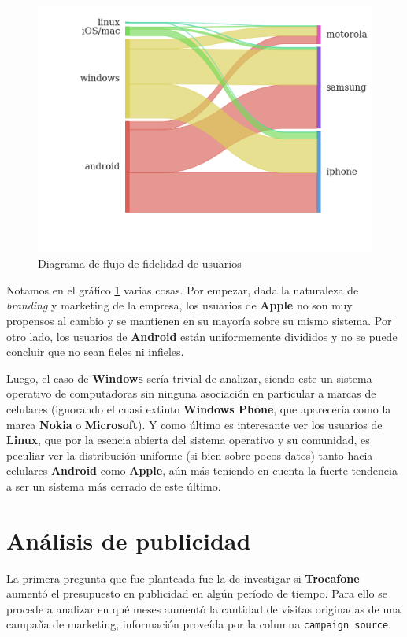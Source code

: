 \documentclass[a4paper]{article}
\begin{document}
\begin{figure}[h!]
	\includegraphics[width=\linewidth]{figures/151-os_brands-sankey.png}
	\caption{Diagrama de flujo de fidelidad de usuarios}
	\label{fig:sankey}
\end{figure}

Notamos en el gráfico \ref{fig:sankey} varias cosas. Por empezar, dada la naturaleza de \textit{branding} y marketing de la empresa, los usuarios de \textbf{Apple} no son muy propensos al cambio y se mantienen en su mayoría sobre su mismo sistema. Por otro lado, los usuarios de \textbf{Android} están uniformemente divididos y no se puede concluir que no sean fieles ni infieles. 

Luego, el caso de \textbf{Windows} sería trivial de analizar, siendo este un sistema operativo de computadoras sin ninguna asociación en particular a marcas de celulares (ignorando el cuasi extinto \textbf{Windows Phone}, que aparecería como la marca \textbf{Nokia} o \textbf{Microsoft}). Y como último es interesante ver los usuarios de \textbf{Linux}, que por la esencia abierta del sistema operativo y su comunidad, es peculiar ver la distribución uniforme (si bien sobre pocos datos) tanto hacia celulares \textbf{Android} como \textbf{Apple}, aún más teniendo en cuenta la fuerte tendencia a ser un sistema más cerrado de este último.

\section{Análisis de publicidad}

La primera pregunta que fue planteada fue la de investigar si \textbf{Trocafone} aumentó el presupuesto en publicidad en algún período de tiempo. Para ello se procede a analizar en qué meses aumentó la cantidad de visitas originadas de una campaña de marketing, información proveída por la columna \texttt{campaign source}.
\end{document}
